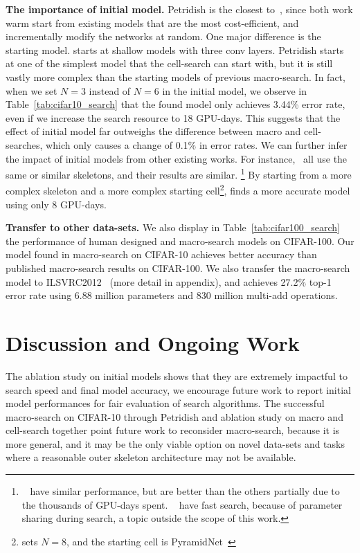 \documentclass{article}
\newcommand{\Petridish}{Petridish\xspace}
\begin{document}
\textbf{The importance of initial model.}
\Petridish is the closest to~\citep{Elsken2018EfficientMN}, since both work warm start from existing models that are the most cost-efficient, and incrementally modify the networks at random. One major difference is the starting model. \citet{Elsken2018EfficientMN} starts at shallow models with three conv layers. \Petridish starts at one of the simplest model that the cell-search can start with, but it is still vastly more complex than the starting models of previous macro-search. 
In fact, when we set $N=3$ instead of $N=6$ in the initial model, we observe in Table~\ref{tab:cifar10_search} that the found model only achieves 3.44\% error rate, even if we increase the search resource to 18 GPU-days. This suggests that the effect of initial model far outweighs the difference between macro and cell-searches, which only causes a change of 0.1\% in error rates. 
We can further infer the impact of initial models from other existing works. For instance,~\citep{NASCell,Real2018RegularizedEF,Pham2018EfficientNA,Liu2018DARTSDA,NAONet} all use the same or similar skeletons, and their results are similar.
\footnote{~\citep{NASCell,Real2018RegularizedEF} have similar performance, but are better than the others partially due to the thousands of GPU-days spent. ~\citep{Pham2018EfficientNA,Liu2018DARTSDA,NAONet} have fast search, because of parameter sharing during search, a topic outside the scope of this work.}
By starting from a more complex skeleton and a more complex starting cell\footnote{\citep{CaiPathLevel} sets $N=8$, and the starting cell is PyramidNet~\citep{pyramidnet}}, \citep{CaiPathLevel} finds a more accurate model using only 8 GPU-days. 


\textbf{Transfer to other data-sets.}
We also display in Table~\ref{tab:cifar100_search} the performance of human designed and macro-search models on CIFAR-100. Our model found in macro-search on CIFAR-10 achieves better accuracy than published macro-search results on CIFAR-100. We also transfer the macro-search model to ILSVRC2012~\citep{ILSVRC15} (more detail in appendix), and achieves 27.2\% top-1 error rate using 6.88 million parameters and 830 million multi-add operations.

\vspace{-3pt}
\section{Discussion and Ongoing Work}
\label{sec:conclusion}
\vspace{-3pt}
The ablation study on initial models shows that they are extremely impactful to search speed and final model accuracy, we encourage future work to report initial model performances for fair evaluation of search algorithms. 
The successful macro-search on CIFAR-10 through \Petridish and ablation study on macro and cell-search together point future work to reconsider macro-search, because it is more general, and it may be the only viable option on novel data-sets and tasks where a reasonable outer skeleton architecture may not be available.
\end{document}
